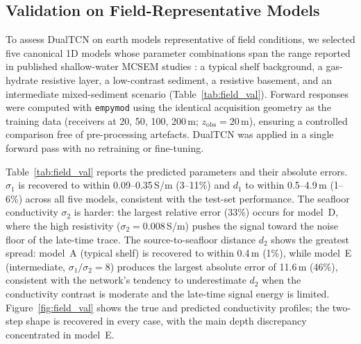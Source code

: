 \documentclass[journal]{IEEEtran}
\begin{document}
\subsection{Validation on Field-Representative Models}
\label{sec:field_val}

To assess DualTCN on earth models representative of field conditions, we
selected five canonical 1D models whose parameter combinations span the
range reported in published shallow-water MCSEM studies
\citep{constable2010ten, key2012marine}: a typical shelf background, a
gas-hydrate resistive layer, a low-contrast sediment, a resistive
basement, and an intermediate mixed-sediment scenario (Table~\ref{tab:field_val}).
Forward responses were computed with \texttt{empymod} using the identical
acquisition geometry as the training data (receivers at 20, 50, 100,
200\,m; $z_\mathrm{obs} = 20$\,m), ensuring a controlled comparison free
of pre-processing artefacts. DualTCN was applied in a single forward pass
with no retraining or fine-tuning.

Table~\ref{tab:field_val} reports the predicted parameters and their
absolute errors.  $\sigma_1$ is recovered to within 0.09--0.35\,S/m
(3--11\%) and $d_1$ to within 0.5--4.9\,m (1--6\%) across all five
models, consistent with the test-set performance.  The seafloor
conductivity $\sigma_2$ is harder: the largest relative error (33\%)
occurs for model~D, where the high resistivity ($\sigma_2 = 0.008$\,S/m)
pushes the signal toward the noise floor of the late-time trace.
The source-to-seafloor distance $d_2$ shows the greatest spread: model~A
(typical shelf) is recovered to within 0.4\,m (1\%), while model~E
(intermediate, $\sigma_1/\sigma_2 = 8$) produces the largest absolute
error of 11.6\,m (46\%), consistent with the network's tendency to
underestimate $d_2$ when the conductivity contrast is moderate and the
late-time signal energy is limited.  Figure~\ref{fig:field_val} shows
the true and predicted conductivity profiles; the two-step shape is
recovered in every case, with the main depth discrepancy concentrated
in model~E.
\end{document}
